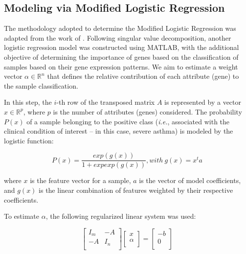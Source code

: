 \subsection{Modeling via Modified Logistic Regression}

The methodology adopted to determine the Modified Logistic Regression was adapted from the work of %
\cite{morais-rodrigues_analysis_2020}
. Following singular value decomposition, another logistic regression model was constructed using MATLAB, with the additional objective of determining the importance of genes based on the classification of samples based on their gene expression patterns. We aim to estimate a weight vector $\alpha \in \mathbb{R}^n$ that defines the relative contribution of each attribute (gene) to the sample classification.

In this step, the $i$-th row of the transposed matrix $A$ is represented by a vector $x \in \mathbb{R}^p$, where $p$ is the number of attributes (genes) considered. The probability $P(x)$ of a sample belonging to the positive class (\textit{i.e.}, associated with the clinical condition of interest – in this case, severe asthma) is modeled by the logistic function:

\begin{equation}
  \label{eq:2-frac}
  P(x) = \frac{exp(g(x))}{1 + exp exp(g(x))}, with\ g(x) = x^t a
\end{equation}

where $x$ is the feature vector for a sample, $a$ is the vector of model coefficients, and $g(x)$ is the linear combination of features weighted by their respective coefficients.

To estimate $\alpha$, the following regularized linear system was used:

\begin{equation}
  \label{eq:3-matrix}
  \begin{bmatrix}
    I_m & -A  \\
    -A  & I_n \\
  \end{bmatrix}
  \begin{bmatrix}
    x      \\
    \alpha \\
  \end{bmatrix}
  =
  \begin{bmatrix}
    -b \\
    0  \\
  \end{bmatrix}
\end{equation}

